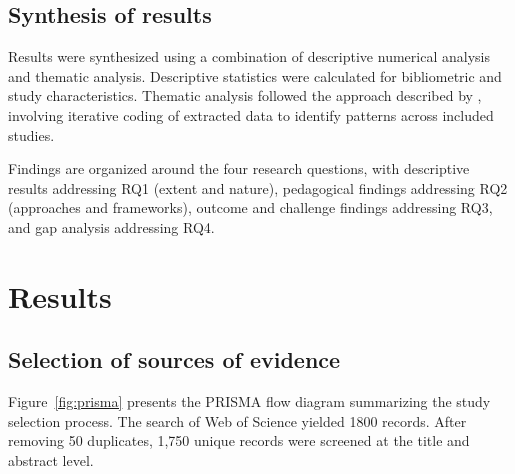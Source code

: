 \documentclass[ed]{acnsart}
\newcommand{\nsearched}{1800}
\begin{document}
\subsection{Synthesis of results}

Results were synthesized using a combination of descriptive numerical analysis and thematic analysis. Descriptive statistics were calculated for bibliometric and study characteristics. Thematic analysis followed the approach described by \citet{Braun2006}, involving iterative coding of extracted data to identify patterns across included studies.

Findings are organized around the four research questions, with descriptive results addressing RQ1 (extent and nature), pedagogical findings addressing RQ2 (approaches and frameworks), outcome and challenge findings addressing RQ3, and gap analysis addressing RQ4.


\section{Results}
\label{sec:results}

\subsection{Selection of sources of evidence}

Figure~\ref{fig:prisma} presents the PRISMA flow diagram summarizing the study selection process. The search of Web of Science yielded \nsearched{} records. After removing 50 duplicates, 1,750 unique records were screened at the title and abstract level.
\end{document}
